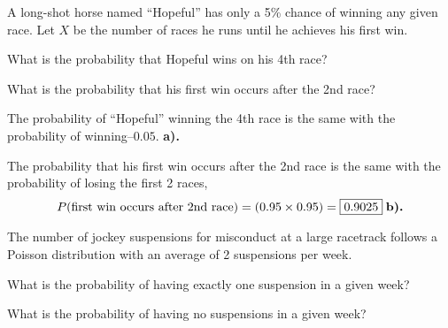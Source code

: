 \documentclass[a4paper, 10pt]{article}
\begin{document}
\begin{tosubmit}
\problem[5]
A long-shot horse named ``Hopeful'' has only a 5\% chance of winning any given race.
Let \( X \) be the number of races he runs until he achieves his first win.
\begin{subproblems}
    \item What is the probability that Hopeful wins on his 4th race?
    \item What is the probability that his first win occurs after the 2nd race?
\end{subproblems}

\par\noindent\submitsolution
The probability of ``Hopeful'' winning the 4th race is the same with the probability of winning--\(\boxed{0.05}\). \textbf{a).}

\noindent The probability that his first win occurs after the 2nd race is
the same with the probability of losing the first 2 races,
\[
    P(\text{first win occurs after 2nd race}) = \left(0.95 \times 0.95\right) = \boxed{0.9025} \; \textbf{b).}  \\
\]
\end{tosubmit}

\pagebreak

\begin{problem}
The number of jockey suspensions for misconduct at a large racetrack
follows a Poisson distribution with an average of 2 suspensions per week.
\begin{subproblems}
    \item What is the probability of having exactly one suspension in a given week?
    \item What is the probability of having no suspensions in a given week?
\end{subproblems}
\end{problem}
\end{document}
